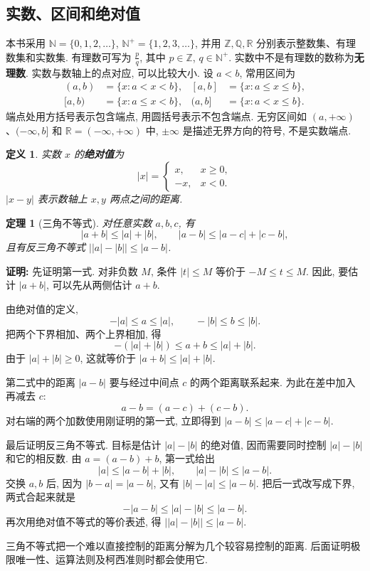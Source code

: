 \documentclass[UTF8,openany]{ctexbook}
\theoremstyle{chinesetextbook}
\newtheorem{definition}{定义}[section]
\newtheorem{theorem}{定理}[section]
\newenvironment{cnproof}{\par\indent\textbf{证明:} \ignorespaces}{\par}
\begin{document}
\subsection{实数、区间和绝对值}
本书采用 $\mathbb N=\{0,1,2,\ldots\}$, $\mathbb N^+=\{1,2,3,\ldots\}$, 并用 $\mathbb Z,\mathbb Q,\mathbb R$ 分别表示整数集、有理数集和实数集. 有理数可写为 $\displaystyle \frac pq$, 其中 $p\in\mathbb Z$, $q\in\mathbb N^+$. 实数中不是有理数的数称为\textbf{无理数}. 
实数与数轴上的点对应, 可以比较大小. 设 $a<b$, 常用区间为
\[
\begin{aligned}
(a,b)&=\{x:a<x<b\},& [a,b]&=\{x:a\le x\le b\},\\
[a,b)&=\{x:a\le x<b\},& (a,b]&=\{x:a<x\le b\}.
\end{aligned}
\]
端点处用方括号表示包含端点, 用圆括号表示不包含端点. 无穷区间如 $(a,+\infty)$、$(-\infty,b]$ 和 $\mathbb R=(-\infty,+\infty)$ 中, $\pm\infty$ 是描述无界方向的符号, 不是实数端点.
\begin{definition}
实数 $x$ 的\textbf{绝对值}为
\[
|x|=\begin{cases}x,&x\ge0,\\-x,&x<0.\end{cases}
\]
$|x-y|$ 表示数轴上 $x,y$ 两点之间的距离.
\end{definition}
\begin{theorem}[三角不等式]
对任意实数 $a,b,c$, 有
\[
|a+b|\le|a|+|b|,\qquad |a-b|\le|a-c|+|c-b|,
\]
且有反三角不等式 $\bigl||a|-|b|\bigr|\le|a-b|$.
\end{theorem}
\begin{cnproof}
先证明第一式. 对非负数 $M$, 条件 $|t|\le M$ 等价于 $-M\le t\le M$. 因此, 要估计 $|a+b|$, 可以先从两侧估计 $a+b$.

由绝对值的定义,
\[
-|a|\le a\le |a|,\qquad -|b|\le b\le |b|.
\]
把两个下界相加、两个上界相加, 得
\[
-(|a|+|b|)\le a+b\le |a|+|b|.
\]
由于 $|a|+|b|\ge0$, 这就等价于 $|a+b|\le|a|+|b|$.

第二式中的距离 $|a-b|$ 要与经过中间点 $c$ 的两个距离联系起来. 为此在差中加入再减去 $c$:
\[
a-b=(a-c)+(c-b).
\]
对右端的两个加数使用刚证明的第一式, 立即得到 $|a-b|\le|a-c|+|c-b|$.

最后证明反三角不等式. 目标是估计 $|a|-|b|$ 的绝对值, 因而需要同时控制 $|a|-|b|$ 和它的相反数. 由 $a=(a-b)+b$, 第一式给出
\[
|a|\le |a-b|+|b|,\qquad |a|-|b|\le |a-b|.
\]
交换 $a,b$ 后, 因为 $|b-a|=|a-b|$, 又有 $|b|-|a|\le|a-b|$. 把后一式改写成下界, 两式合起来就是
\[
-|a-b|\le |a|-|b|\le |a-b|.
\]
再次用绝对值不等式的等价表述, 得 $\bigl||a|-|b|\bigr|\le|a-b|$.
\end{cnproof}
三角不等式把一个难以直接控制的距离分解为几个较容易控制的距离. 后面证明极限唯一性、运算法则及柯西准则时都会使用它.
\end{document}
